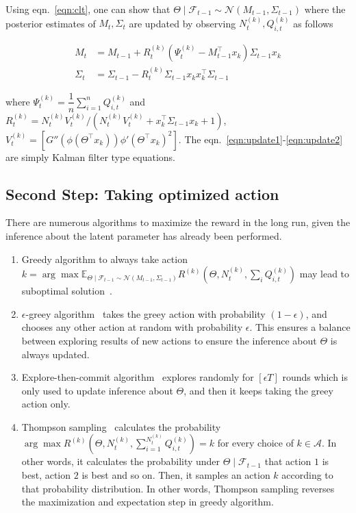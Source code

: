\documentclass[11pt]{article}
\newcommand{\E}{\mathbb{E}}
\newcommand{\Acal}{\mathcal{A}}
\newcommand{\Fcal}{\mathcal{F}}
\newcommand{\transpose}{^{\intercal}}
\begin{document}
\noindent Using eqn.~\eqref{eqn:clt}, one can show that $\Theta \mid \Fcal_{t-1} \sim \mathcal{N}(M_{t-1}, \Sigma_{t-1})$ where the posterior estimates of $M_{t}, \Sigma_t$ are updated by observing $N_t^{(k)}, Q_{i,t}^{(k)}$ as follows

\begin{align}
    M_t & = M_{t-1} + R_t^{(k)} (\Psi_t^{(k)} - M_{t-1}\transpose x_k)\Sigma_{t-1} x_k \label{eqn:update1}\\
    \Sigma_t & = \Sigma_{t-1} - R_t^{(k)} \Sigma_{t-1}x_k x_k\transpose \Sigma_{t-1} \label{eqn:update2}
\end{align}

\noindent where $\Psi_t^{(k)} = \dfrac{1}{n}\sum_{i=1}^n Q_{i,t}^{(k)}$ and $R_t^{(k)} = N_t^{(k)} V_t^{(k)} / (N_t^{(k)} V_t^{(k)} + x_k\transpose \Sigma_{t-1} x_k + 1)$, $V_t^{(k)} = [G''(\phi(\Theta\transpose x_k))\phi'(\Theta\transpose x_k)^2]$. The eqn.~\eqref{eqn:update1}-\eqref{eqn:update2} are simply Kalman filter type equations.

\subsection{Second Step: Taking optimized action}

There are numerous algorithms to maximize the reward in the long run, given the inference about the latent parameter has already been performed.

\begin{enumerate}
    \item Greedy algorithm to always take action $k = \arg\max \E_{\Theta \mid \Fcal_{t-1} \sim \mathcal{N}(M_{t-1}, \Sigma_{t-1})} R^{(k)}(\Theta, N_t^{(k)}, \sum_i Q_{i, t}^{(k)})$ may lead to suboptimal solution~\cite{russo2017tutorial}.
    \item $\epsilon$-greey algorithm~\cite{vermorel2005multi} takes the greey action with probability $(1-\epsilon)$, and chooses any other action at random with probability $\epsilon$. This ensures a balance between exploring results of new actions to ensure the inference about $\Theta$ is always updated.
    \item Explore-then-commit algorithm~\cite{rusmevichientong2010linearly} explores randomly for $[\epsilon T]$ rounds which is only used to update inference about $\Theta$, and then it keeps taking the greey action only.
    \item Thompson sampling~\cite{thompson1933likelihood} calculates the probability $\arg\max R^{(k)}(\Theta, N_t^{(k)}, \sum_{i=1}^{N_t^{(k)}}Q_{i, t}^{(k)}) = k$ for every choice of $k \in \Acal$. In other words, it calculates the probability under $\Theta \mid \Fcal_{t-1}$ that action $1$ is best, action $2$ is best and so on. Then, it samples an action $k$ according to that probability distribution. In other words, Thompson sampling reverses the maximization and expectation step in greedy algorithm.
\end{enumerate}
\end{document}

